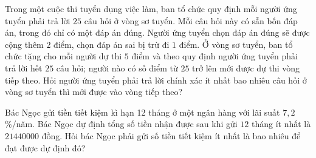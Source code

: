 \begin{vd}
	Trong một cuộc thi tuyển dụng việc làm, ban tổ chức quy định mỗi người ứng tuyển phải trả lời $25$ câu hỏi ở vòng sơ tuyển. Mỗi câu hỏi này có sẵn bốn đáp án, trong đó chỉ có một đáp án đúng. Người ứng tuyển chọn đáp án đúng sẽ được cộng thêm $2$ điểm, chọn đáp án sai bị trừ đi $1$ điểm. Ở vòng sơ tuyển, ban tổ chức tặng cho mỗi người dự thi $5$ điểm và theo quy định người ứng tuyển phải trả lời hết $25$ câu hỏi; người nào có số điểm từ $25$ trở lên mới được dự thi vòng tiếp theo. Hỏi người ứng tuyển phải trả lời chính xác ít nhất bao nhiêu câu hỏi ở vòng sơ tuyển thì mới được vào vòng tiếp theo?
\end{vd}
\begin{vd}
	Bác Ngọc gửi tiền tiết kiệm kì hạn 12 tháng ở một ngân hàng với lãi suất $7{,}2$\%/năm. Bác Ngọc dự định tổng số tiền nhận được sau khi gửi $12$ tháng ít nhất là $21440000$ đồng. Hỏi bác Ngọc phải gửi số tiền tiết kiệm ít nhất là bao nhiêu để đạt được dự định đó?
\end{vd}

